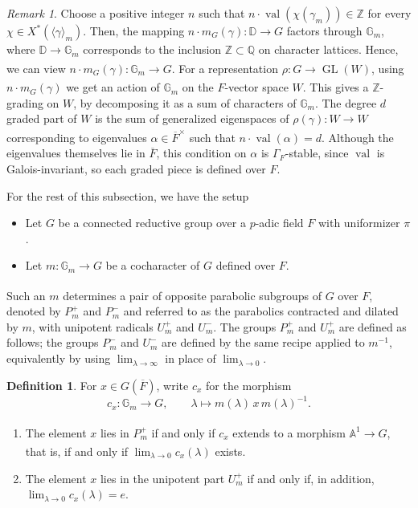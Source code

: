 \documentclass[11pt,a4paper]{article}
\theoremstyle{definition}
\newtheorem{D}[shared]{Definition}
\theoremstyle{plain}
\theoremstyle{remark}
\newtheorem{R}[shared]{Remark}
\theoremstyle{plain}
\DeclareMathOperator{\GL}{GL}
\DeclareMathOperator{\val}{val}
\begin{document}
\begin{R}\label{deligneslopedecomposition}
    Choose a positive integer $n$ such that $n \cdot \val(\chi(\gamma_m)) \in \mathbb{Z}$ for every $\chi \in X^*(\langle \gamma \rangle_m)$. Then, the mapping $n \cdot m_G(\gamma): \mathbb{D} \xrightarrow[]{} G$ factors through $\mathbb{G}_m$, where $\mathbb{D} \xrightarrow[]{} \mathbb{G}_m$ corresponds to the inclusion $\mathbb{Z} \subset \mathbb{Q}$ on character lattices. Hence, we can view $n \cdot m_G(\gamma): \mathbb{G}_m \xrightarrow[]{} G$. For a representation $\rho: G \xrightarrow[]{} \GL(W)$, using $n \cdot m_G(\gamma)$ we get an action of $\mathbb{G}_m$ on the $F$-vector space $W$. This gives a $\mathbb{Z}$-grading on $W$, by decomposing it as a sum of characters of $\mathbb{G}_m$. The degree $d$ graded part of $W$ is the sum of generalized eigenspaces of $\rho(\gamma): W \xrightarrow[]{} W$ corresponding to eigenvalues $\alpha \in \overline{F}^{\times}$ such that $n \cdot \val(\alpha) = d$. Although the eigenvalues themselves lie in $\overline{F}$, this condition on $\alpha$ is $\Gamma_F$-stable, since $\val$ is Galois-invariant, so each graded piece is defined over $F$.
\end{R}

For the rest of this subsection, we have the setup
    \begin{itemize}
        \item Let $G$ be a connected reductive group over a $p$-adic field $F$ with uniformizer $\pi$.
        \item Let $m: \mathbb{G}_m \xrightarrow[]{} G$ be a cocharacter of $G$ defined over $F$.
    \end{itemize}

Such an $m$ determines a pair of opposite parabolic subgroups of $G$ over $F$, denoted by $P_m^+$ and $P_m^-$ and referred to as the parabolics contracted and dilated by $m$, with unipotent radicals $U_m^+$ and $U_m^-$. The groups $P_m^+$ and $U_m^+$ are defined as follows; the groups $P_m^-$ and $U_m^-$ are defined by the same recipe applied to $m^{-1}$, equivalently by using $\lim_{\lambda \to \infty}$ in place of $\lim_{\lambda \to 0}$.

\begin{D}\label{contracteddilated}
    For $x \in G(\overline{F})$, write $c_x$ for the morphism
    $$c_x: \mathbb{G}_m \xrightarrow[]{} G, \qquad \lambda \mapsto m(\lambda) \, x \, m(\lambda)^{-1}.$$
    \begin{enumerate}
        \item The element $x$ lies in $P_m^+$ if and only if $c_x$ extends to a morphism $\mathbb{A}^1 \xrightarrow[]{} G$, that is, if and only if $\lim_{\lambda \to 0} c_x(\lambda)$ exists.
        \item The element $x$ lies in the unipotent part $U_m^+$ if and only if, in addition, $\lim_{\lambda \to 0} c_x(\lambda) = e$.
    \end{enumerate}
\end{D}
\end{document}
